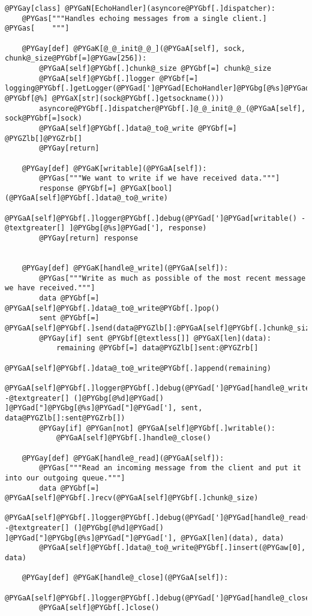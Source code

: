 \documentclass[a4paper,10pt,english]{manual}
\begin{document}
\begin{Verbatim}[commandchars=@\[\]]
@PYGay[class] @PYGaN[EchoHandler](asyncore@PYGbf[.]dispatcher):
    @PYGas["""Handles echoing messages from a single client.]
@PYGas[    """]

    @PYGay[def] @PYGaK[@_@_init@_@_](@PYGaA[self], sock, chunk@_size@PYGbf[=]@PYGaw[256]):
        @PYGaA[self]@PYGbf[.]chunk@_size @PYGbf[=] chunk@_size
        @PYGaA[self]@PYGbf[.]logger @PYGbf[=] logging@PYGbf[.]getLogger(@PYGad[']@PYGad[EchoHandler]@PYGbg[@%s]@PYGad['] @PYGbf[@%] @PYGaX[str](sock@PYGbf[.]getsockname()))
        asyncore@PYGbf[.]dispatcher@PYGbf[.]@_@_init@_@_(@PYGaA[self], sock@PYGbf[=]sock)
        @PYGaA[self]@PYGbf[.]data@_to@_write @PYGbf[=] @PYGZlb[]@PYGZrb[]
        @PYGay[return]

    @PYGay[def] @PYGaK[writable](@PYGaA[self]):
        @PYGas["""We want to write if we have received data."""]
        response @PYGbf[=] @PYGaX[bool](@PYGaA[self]@PYGbf[.]data@_to@_write)
        @PYGaA[self]@PYGbf[.]logger@PYGbf[.]debug(@PYGad[']@PYGad[writable() -@textgreater[] ]@PYGbg[@%s]@PYGad['], response)
        @PYGay[return] response


    @PYGay[def] @PYGaK[handle@_write](@PYGaA[self]):
        @PYGas["""Write as much as possible of the most recent message we have received."""]
        data @PYGbf[=] @PYGaA[self]@PYGbf[.]data@_to@_write@PYGbf[.]pop()
        sent @PYGbf[=] @PYGaA[self]@PYGbf[.]send(data@PYGZlb[]:@PYGaA[self]@PYGbf[.]chunk@_size@PYGZrb[])
        @PYGay[if] sent @PYGbf[@textless[]] @PYGaX[len](data):
            remaining @PYGbf[=] data@PYGZlb[]sent:@PYGZrb[]
            @PYGaA[self]@PYGbf[.]data@_to@_write@PYGbf[.]append(remaining)
        @PYGaA[self]@PYGbf[.]logger@PYGbf[.]debug(@PYGad[']@PYGad[handle@_write() -@textgreater[] (]@PYGbg[@%d]@PYGad[) ]@PYGad["]@PYGbg[@%s]@PYGad["]@PYGad['], sent, data@PYGZlb[]:sent@PYGZrb[])
        @PYGay[if] @PYGan[not] @PYGaA[self]@PYGbf[.]writable():
            @PYGaA[self]@PYGbf[.]handle@_close()

    @PYGay[def] @PYGaK[handle@_read](@PYGaA[self]):
        @PYGas["""Read an incoming message from the client and put it into our outgoing queue."""]
        data @PYGbf[=] @PYGaA[self]@PYGbf[.]recv(@PYGaA[self]@PYGbf[.]chunk@_size)
        @PYGaA[self]@PYGbf[.]logger@PYGbf[.]debug(@PYGad[']@PYGad[handle@_read() -@textgreater[] (]@PYGbg[@%d]@PYGad[) ]@PYGad["]@PYGbg[@%s]@PYGad["]@PYGad['], @PYGaX[len](data), data)
        @PYGaA[self]@PYGbf[.]data@_to@_write@PYGbf[.]insert(@PYGaw[0], data)

    @PYGay[def] @PYGaK[handle@_close](@PYGaA[self]):
        @PYGaA[self]@PYGbf[.]logger@PYGbf[.]debug(@PYGad[']@PYGad[handle@_close()]@PYGad['])
        @PYGaA[self]@PYGbf[.]close()




\end{Verbatim}
\end{document}
